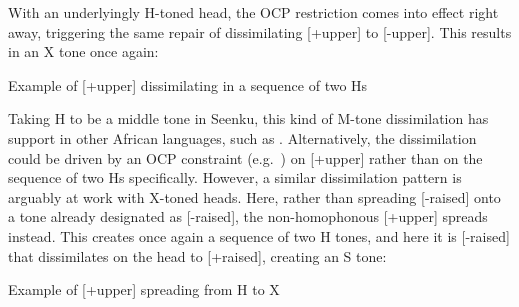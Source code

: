 \documentclass[output=paper]{langsci/langscibook}
\begin{document}
With an underlyingly H-toned head, the OCP restriction comes into effect right away, triggering the same repair of dissimilating [+upper] to [-upper]. This results in an X tone once again:

\ea\label{ex:mcpherson:24} Example of [+upper] dissimilating in a sequence of two Hs \\
\z

Taking H to be a middle tone in Seenku, this kind of M-tone dissimilation has support in other African languages, such as  \citep{Paster03}. Alternatively, the dissimilation could be driven by an OCP constraint (e.g.\ \citealt{McCarthy86}) on [+upper] rather than on the sequence of two Hs specifically. However, a similar dissimilation pattern is arguably at work with X-toned heads. Here, rather than spreading [-raised] onto a tone already designated as [-raised], the non-homophonous [+upper] spreads instead. This creates once again a sequence of two H tones, and here it is [-raised] that dissimilates on the head to [+raised], creating an S tone:

\ea\label{ex:mcpherson:25} Example of [+upper] spreading from H to X \\
\z
\end{document}
